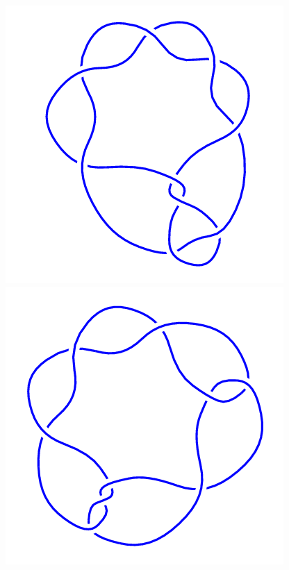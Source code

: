 \begin{figure}[H]
	\begin{minipage}[b]{.18\linewidth}
		\centering
		\includegraphics[width=\linewidth]{../data/9_6.png}
	\end{minipage}
	\begin{minipage}[b]{.18\linewidth}
		\centering
		\includegraphics[width=\linewidth]{../data/9_7.png}

\end{minipage}
\end{figure}
